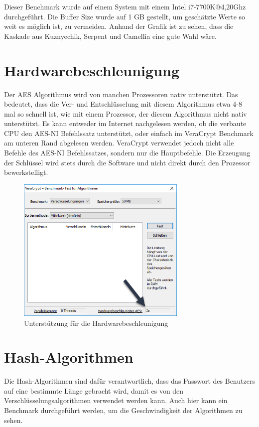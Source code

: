\documentclass[12pt,a4paper]{scrreprt}
\begin{document}
\noindent Dieser Benchmark wurde auf einem System mit einem Intel i7-7700K@4,20Ghz durchgeführt. Die Buffer Size wurde auf 1 GB gestellt, um geschätzte Werte so weit es möglich ist, zu vermeiden. Anhand der Grafik ist zu sehen, dass die Kaskade aus Kuznyechik, Serpent und Camellia eine gute Wahl wäre.

\section{Hardwarebeschleunigung}

Der AES Algorithmus wird von manchen Prozessoren nativ unterstützt. Das bedeutet, dass die Ver- und Entschlüsselung mit diesem Algorithmus etwa 4-8 mal so schnell ist, wie mit einem Prozessor, der diesem Algorithmus nicht nativ unterstützt. Es kann entweder im Internet nachgelesen werden, ob die verbaute CPU den AES-NI Befehlssatz unterstützt, oder einfach im VeraCrypt Benchmark am unteren Rand abgelesen werden. VeraCrypt verwendet jedoch nicht alle Befehle des AES-NI Befehlssatzes, sondern nur die Hauptbefehle. Die Erzeugung der Schlüssel wird stets durch die Software und nicht direkt durch den Prozessor bewerkstelligt.

\begin{figure}[h!]
\begin{center}
\includegraphics[width=230pt]{media/aessupport.png}
\caption{Unterstützung für die Hardwarebeschleunigung}
\label{aessupport}
\end{center}
\end{figure}

\newpage

\section{Hash-Algorithmen}
Die Hash-Algorithmen sind dafür verantwortlich, dass das Passwort des Benutzers auf eine bestimmte Länge gebracht wird, damit es von den Verschlüsselungsalgorithmen verwendet werden kann. Auch hier kann ein Benchmark durchgeführt werden, um die Geschwindigkeit der Algorithmen zu sehen.
\end{document}
